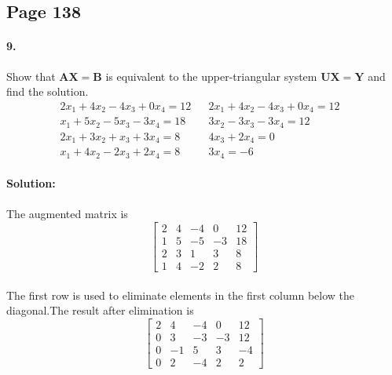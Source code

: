 \documentclass{article}  %
\begin{document}
        \subsection*{Page 138}
        \paragraph{9.}Show that $\bm{AX = B}$ is equivalent to the upper-triangular system $\bm{UX = Y}$ and find the solution.
        \begin{align*}
            2x_1 + 4x_2 - 4x_3 + 0x_4 = 12& & 2x_1 + 4x_2 - 4x_3 + 0x_4 = 12 &\\
            x_1 + 5x_2 - 5x_3 - 3x_4 = 18& & 3x_2 - 3x_3 - 3x_4 = 12 &\\
            2x_1 + 3x_2 + x_3 + 3x_4 = 8& & 4x_3 + 2x_4 = 0 &\\
            x_1 + 4x_2 - 2x_3 + 2x_4 = 8& & 3x_4 = -6 &
        \end{align*}
        \paragraph{Solution:}
        \paragraph{}The augmented matrix is 
        \begin{equation*}       %
            \left[                 %
              \begin{array}{rrrr|r}   %
                2 & 4 & -4 & 0 & 12 \\  %
                1 & 5 & -5 & -3 & 18 \\  %
                2 & 3 & 1 & 3 & 8 \\
                1 & 4 & -2 & 2 & 8
              \end{array}
            \right]                 %
        \end{equation*}
        \paragraph{}The first row is used to eliminate elements in the first column below the diagonal.The result after elimination is
        \begin{equation*}       %
            \left[                 %
              \begin{array}{rrrr|r}   %
                2 & 4 & -4 & 0 & 12 \\
                0 & 3 & -3 & -3 & 12 \\
                0 & -1 & 5 & 3 & -4 \\
                0 & 2 & -4 & 2 & 2 
              \end{array}
            \right]                 %
        \end{equation*}
\end{document}
